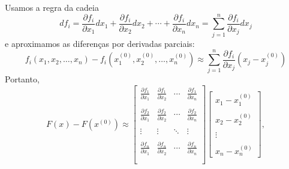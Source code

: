 Usamos a regra da cadeia
\begin{equation} df_i = \frac{\partial f_i}{\partial x_1} dx_1+\frac{\partial f_i}{\partial x_2} dx_2+\cdots + \frac{\partial f_i}{\partial x_n} dx_n=\sum_{j=1}^n\frac{\partial f_i}{\partial x_j} dx_j \end{equation}
e aproximamos as diferenças por derivadas parciais:
\begin{equation}  f_i(x_1,x_2,\ldots,x_n)-f_i(x_1^{(0)},x_2^{(0)},\ldots,x_n^{(0)})\approx \sum_{j=1}^n \frac{\partial f_i}{\partial x_j}\left(x_j-x_j^{(0)}\right) \end{equation}
Portanto,
\begin{equation}\label{eq_approx_newton}F(x)-F(x^{(0)})\approx \left[
\begin{array}{ccccc}
\frac{\partial f_1}{\partial x_1}&\frac{\partial f_1}{\partial x_2}&\cdots&\frac{\partial f_1}{\partial x_n}\\~\\
\frac{\partial f_2}{\partial x_1}&\frac{\partial f_2}{\partial x_2}&\cdots&\frac{\partial f_2}{\partial x_n}\\~\\
\vdots&\vdots&\ddots&\vdots\\~\\
\frac{\partial f_n}{\partial x_1}&\frac{\partial f_n}{\partial x_2}&\cdots&\frac{\partial f_n}{\partial x_n}\\~\\
\end{array}
\right]\left[
\begin{array}{c}
x_1-x_1^{(0)}\\~~\\
x_2-x_2^{(0)}\\~~\\
\vdots\\~~\\
x_n-x_n^{(0)}
\end{array}
\right],
\end{equation}

